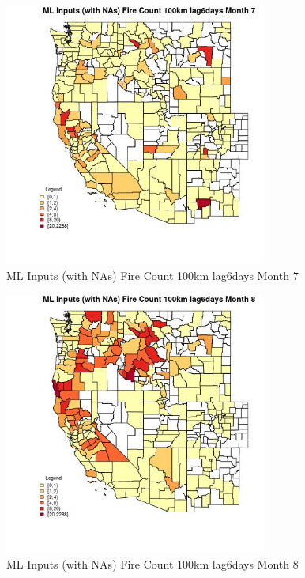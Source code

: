 \begin{figure} 
\centering  
\includegraphics[width=0.77\textwidth]{Code_Outputs/Report_ML_input_PM25_Step4_part_e_de_duplicated_aves_compiled_2019-05-20wNAs_CountyFire_Count_100km_lag6daysmedianMonth7.jpg} 
\caption{\label{fig:Report_ML_input_PM25_Step4_part_e_de_duplicated_aves_compiled_2019-05-20wNAsCountyFire_Count_100km_lag6daysmedianMonth7}ML Inputs (with NAs) Fire Count 100km lag6days Month 7} 
\end{figure} 
 

\begin{figure} 
\centering  
\includegraphics[width=0.77\textwidth]{Code_Outputs/Report_ML_input_PM25_Step4_part_e_de_duplicated_aves_compiled_2019-05-20wNAs_CountyFire_Count_100km_lag6daysmedianMonth8.jpg} 
\caption{\label{fig:Report_ML_input_PM25_Step4_part_e_de_duplicated_aves_compiled_2019-05-20wNAsCountyFire_Count_100km_lag6daysmedianMonth8}ML Inputs (with NAs) Fire Count 100km lag6days Month 8} 
\end{figure} 
 

